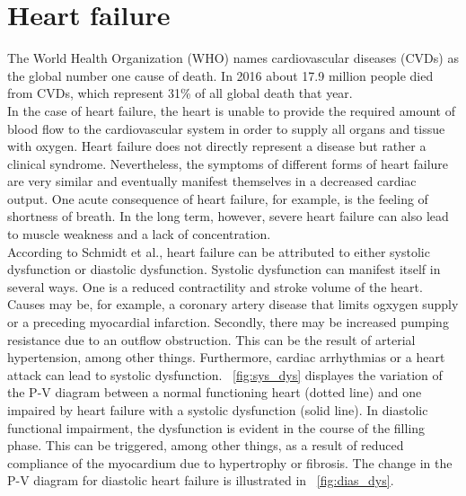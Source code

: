 \section{Heart failure}
The World Health Organization (WHO) names cardiovascular diseases (CVDs) as the global number one cause of death. In 2016 about 17.9 million people died from CVDs, which represent 31{\%} of all global death that year. \cite{WHO}
\\In the case of heart failure, the heart is unable to provide the required amount of blood flow to the cardiovascular system in order to supply all organs and tissue with oxygen.
Heart failure does not directly represent a disease but rather a clinical syndrome. Nevertheless, the symptoms of different forms of heart failure are very similar and eventually manifest themselves in a decreased cardiac output. One acute consequence of heart failure, for example, is the feeling of shortness of breath. In the long term, however, severe heart failure can also lead to muscle weakness and a lack of concentration.
\\According to Schmidt et al.\cite{HKS4}, heart failure can be attributed to either systolic dysfunction or diastolic dysfunction. Systolic dysfunction can manifest itself in several ways. One is a reduced contractility and stroke volume of the heart. Causes may be, for example, a coronary artery disease that limits ogxygen supply or a preceding myocardial infarction. Secondly, there may be increased pumping resistance due to an outflow obstruction.  This can be the result of arterial hypertension, among other things. Furthermore, cardiac arrhythmias or a heart attack can lead to systolic dysfunction. \figurename~\ref{fig:sys_dys} displayes the variation of the P-V diagram between a normal functioning heart (dotted line) and one impaired by heart failure with a systolic dysfunction (solid line). In diastolic functional impairment, the dysfunction is evident in the course of the filling phase. This can be triggered, among other things, as a result of reduced compliance of the myocardium due to hypertrophy or fibrosis. The change in the P-V diagram for diastolic heart failure is illustrated in \figurename~\ref{fig:dias_dys}.
